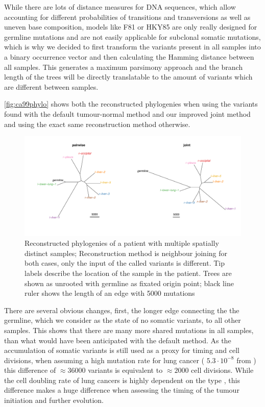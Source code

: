 While there are lots of distance measures for DNA sequences, which allow accounting for different probabilities of transitions and transversions as well as uneven base composition, models like F81 \cite{Felsenstein1981} or HKY85 \cite{Hasegawa1985} are only really designed for germline mutations and are not easily applicable for subclonal somatic mutations, which is why we decided to first transform the variants present in all samples into a binary occurrence vector and then calculating the Hamming distance \cite{Hamming1950} between all samples. This generates a maximum parsimony approach and the branch length of the trees will be directly translatable to the amount of variants which are different between samples. 

\autoref{fig:ca99phylo} shows both the reconstructed phylogenies when using the variants found with the default tumour-normal method and our improved joint method and using the exact same reconstruction method otherwise.

\begin{figure}[!ht]
\centering
\includegraphics[width=.99\linewidth]{Figures/phyloCA99.pdf}
\caption[Reconstructed phylogenies of joint samples]{Reconstructed phylogenies of a patient with multiple spatially distinct samples; Reconstruction method is neighbour joining for both cases, only the input of the called variants is different. Tip labels describe the location of the sample in the patient. Trees are shown as unrooted with germline as fixated origin point; black line ruler shows the length of an edge with 5000 mutations}\label{fig:ca99phylo}
\end{figure}

There are several obvious changes, first, the longer edge connecting the the germline, which we consider as the state of no somatic variants, to all other samples. This shows that there are many more shared mutations in all samples, than what would have been anticipated with the default method. As the accumulation of somatic variants is still used as a proxy for timing and cell divisions, when assuming a high mutation rate for lung cancer ( $5.3 \cdot 10^{-8}$ from \citeauthor*{Werner2020} \cite{Werner2020}) this difference of $\approx 36000$ variants is equivalent to $\approx 2000$ cell divisions. While the cell doubling rate of lung cancers is highly dependent on the type \cite{Arai1994}, this difference makes a huge difference when assessing the timing of the tumour initiation and further evolution. 

